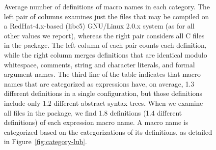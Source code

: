 \documentclass[10pt]{article}
\newcommand{\captionsmall}[1]{\caption[]{\small #1}}
\begin{document}
        
%   

\begin{figure}
  {\small\centerline{}}
  \captionsmall{Average number of definitions of macro names in each category.
    The left pair of columns examines just the files that may be compiled
    on a RedHat-4.x-based (libc5) GNU/Linux 2.0.x system (as for all other values we
    report), whereas the right pair considers all C files in the package.
    The left column of each pair counts each definition, while the right
    column merges definitions that are identical modulo whitespace,
    comments, string and character literals, and formal argument names.
    The third line of the table indicates that macro names that are
    categorized as expressions have, on average, 1.3 different definitions
    in a single configuration, but those definitions include only 1.2
    different abstract syntax trees.  When we examine all files in the
    package, we find 1.8 definitions (1.4 different
    definitions) of each expression macro name.  A macro name is
    categorized based on the categorizations of its definitions, as
    detailed in Figure~\ref{fig:category-lub}.}
  \label{fig:freq-sum-cat}
\end{figure}


\end{document}
